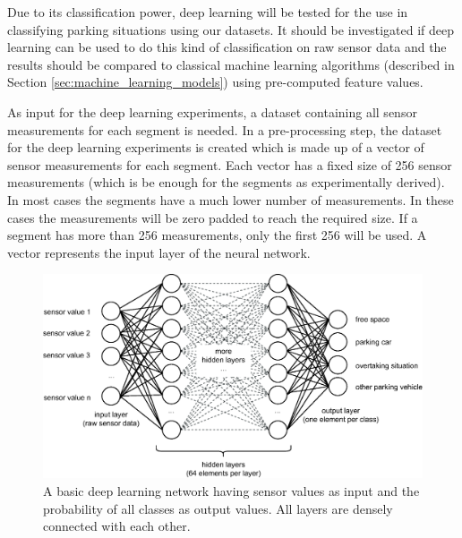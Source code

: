 Due to its classification power, deep learning will be tested for the use in classifying parking situations using our datasets. It should be investigated if deep learning can be used to do this kind of classification on raw sensor data and the results should be compared to classical machine learning algorithms (described in Section \ref{sec:machine_learning_models}) using pre-computed feature values.


As input for the deep learning experiments, a dataset containing all sensor measurements for each segment is needed. In a pre-processing step, the dataset for the deep learning experiments is created which is made up of a vector of sensor measurements for each segment. Each vector has a fixed size of 256 sensor measurements (which is be enough for the segments as experimentally derived). In most cases the segments have a much lower number of measurements. In these cases the measurements will be zero padded to reach the required size. If a segment has more than 256 measurements, only the first 256 will be used. A vector represents the input layer of the neural network. 

\begin{figure}
	\centering
	\includegraphics[width=\textwidth]{img/deep_learning_basic_model_2.eps}
	\caption{A basic deep learning network having sensor values as input and the probability of all classes as output values. All layers are densely connected with each other.}
	\label{fig:densely_dl_network}
\end{figure}





